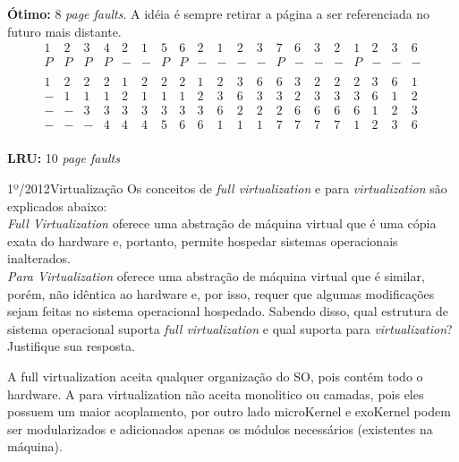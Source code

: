 \begin{exercicio}
  \textbf{Ótimo:} 8 \textit{page faults}. A idéia é sempre retirar a página a ser referenciada no futuro mais distante. \\
  \[
  \begin{array}{cccccccccccccccccccc}
1 & 2 & 3 & 4 & 2 & 1 & 5 & 6 & 2 & 1 & 2 & 3 & 7 & 6 & 3 & 2 & 1 & 2 & 3 & 6 \\ \hline
P & P & P & P & - & - & P & P & - & - & - & - & P & - & - & - & P & - & - & - \\
\\
1 & 2 & 2 & 2 & 1 & 2 & 2 & 2 & 1 & 2 & 3 & 6 & 6 & 3 & 2 & 2 & 2 & 3 & 6 & 1 \\
- & 1 & 1 & 1 & 2 & 1 & 1 & 1 & 2 & 3 & 6 & 3 & 3 & 2 & 3 & 3 & 3 & 6 & 1 & 2 \\
- & - & 3 & 3 & 3 & 3 & 3 & 3 & 3 & 6 & 2 & 2 & 2 & 6 & 6 & 6 & 6 & 1 & 2 & 3 \\
- & - & - & 4 & 4 & 4 & 5 & 6 & 6 & 1 & 1 & 1 & 7 & 7 & 7 & 7 & 1 & 2 & 3 & 6 \\
  \end{array}
  \]

  \textbf{LRU:} 10 \textit{page faults} \\

\end{exercicio}

\begin{exercicio}
  {1º/2012}{Virtualização}
  {Os conceitos de \textit{full virtualization} e para \textit{virtualization} são explicados abaixo:\\
  \textit{Full Virtualization} oferece uma abstração de máquina virtual que é uma cópia exata do hardware e, portanto, permite hospedar sistemas operacionais inalterados.\\
  \textit{Para Virtualization} oferece uma abstração de máquina virtual que é similar, porém, não idêntica ao hardware e, por isso, requer que algumas modificações sejam feitas no sistema operacional hospedado.
  Sabendo disso, qual estrutura de sistema operacional suporta \textit{full virtualization} e qual suporta para \textit{virtualization}? Justifique sua resposta.}

  A full virtualization aceita qualquer organização do SO, pois contém todo o hardware.
  A para virtualization não aceita monolitico ou camadas, pois eles possuem um maior acoplamento, por outro lado microKernel e exoKernel podem ser modularizados e adicionados apenas os módulos necessários (existentes na máquina).
\end{exercicio}

